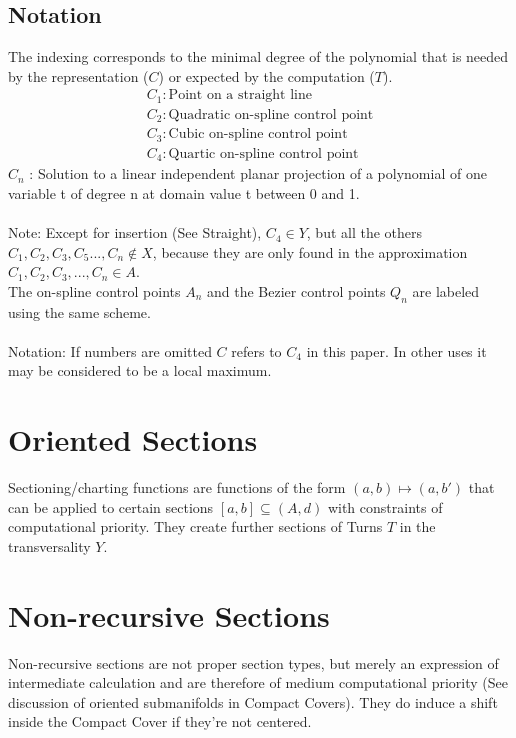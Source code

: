 \documentclass{report}
\begin{document}
\subsection{Notation}
The indexing corresponds to the minimal degree of the polynomial that is needed by the representation ($C$) or expected by the computation ($T$).
\begin{align}
C_{1} : \text{Point on a straight line}\\
C_{2} : \text{Quadratic on-spline control point}\\
C_{3} : \text{Cubic on-spline control point}\\
C_{4} : \text{Quartic on-spline control point}
\end{align}
$C_{n}$ : Solution to a linear independent planar projection of a polynomial of one variable t of degree n at domain value t between 0 and 1.\\\\
Note: Except for insertion (See Straight), $C_{4} \in Y$, but all the others $C_{1},C_{2},C_{3},C_{5}...,C_{n} \not\in X$, because they are only found in the approximation $C_{1},C_{2},C_{3},...,C_{n} \in A$.\\
The on-spline control points $A_{n}$ and the Bezier control points $Q_{n}$ are labeled using the same scheme.\\\\
Notation: If numbers are omitted $C$ refers to $C_{4}$ in this paper. In other uses it may be considered to be a local maximum.

\section*{Oriented Sections}
Sectioning/charting functions are functions of the form $(a,b) \mapsto (a,b')$ that can be applied to certain sections $[a,b] \subseteq (A,d)$ with constraints of computational priority. They create further sections of Turns $T$ in the transversality $Y$.

\section{Non-recursive Sections}
Non-recursive sections are not proper section types, but merely an expression of intermediate calculation and are therefore of medium computational priority (See discussion of oriented submanifolds in Compact Covers). They do induce a shift inside the Compact Cover if they're not centered.\\\\
\end{document}

